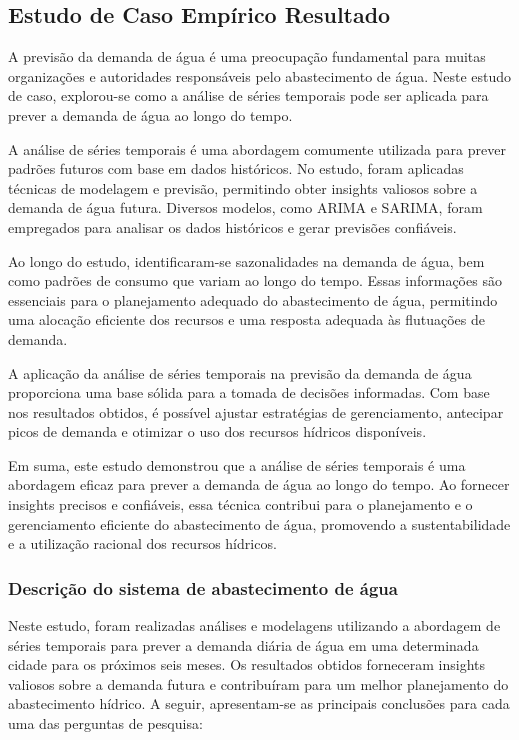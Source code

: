 \subsection{Estudo de Caso Emp\'irico Resultado}\label{subsec:estudo-reslt}


A previsão da demanda de água é uma preocupação fundamental para muitas organizações e autoridades responsáveis pelo abastecimento de água. Neste estudo de caso, explorou-se como a análise de séries temporais pode ser aplicada para prever a demanda de água ao longo do tempo.

A análise de séries temporais é uma abordagem comumente utilizada para prever padrões futuros com base em dados históricos. No estudo, foram aplicadas técnicas de modelagem e previsão, permitindo obter insights valiosos sobre a demanda de água futura. Diversos modelos, como ARIMA e SARIMA, foram empregados para analisar os dados históricos e gerar previsões confiáveis.

Ao longo do estudo, identificaram-se sazonalidades na demanda de água, bem como padrões de consumo que variam ao longo do tempo. Essas informações são essenciais para o planejamento adequado do abastecimento de água, permitindo uma alocação eficiente dos recursos e uma resposta adequada às flutuações de demanda.

A aplicação da análise de séries temporais na previsão da demanda de água proporciona uma base sólida para a tomada de decisões informadas. Com base nos resultados obtidos, é possível ajustar estratégias de gerenciamento, antecipar picos de demanda e otimizar o uso dos recursos hídricos disponíveis.

Em suma, este estudo demonstrou que a análise de séries temporais é uma abordagem eficaz para prever a demanda de água ao longo do tempo. Ao fornecer insights precisos e confiáveis, essa técnica contribui para o planejamento e o gerenciamento eficiente do abastecimento de água, promovendo a sustentabilidade e a utilização racional dos recursos hídricos.



\subsubsection{Descri\c c\~ao do sistema de abastecimento de \'agua}



Neste estudo, foram realizadas análises e modelagens utilizando a abordagem de séries temporais para prever a demanda diária de água em uma determinada cidade para os próximos seis meses. Os resultados obtidos forneceram insights valiosos sobre a demanda futura e contribuíram para um melhor planejamento do abastecimento hídrico. A seguir, apresentam-se as principais conclusões para cada uma das perguntas de pesquisa:

